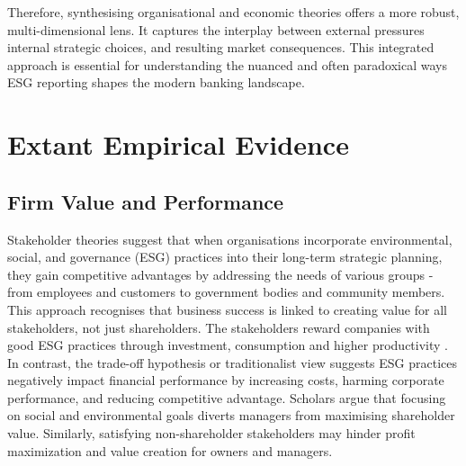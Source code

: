 \documentclass[
  authoryear]{elsarticle}
\begin{document}
Therefore, synthesising organisational and economic theories offers a
more robust, multi-dimensional lens. It captures the interplay between
external pressures internal strategic choices, and resulting market
consequences. This integrated approach is essential for understanding
the nuanced and often paradoxical ways ESG reporting shapes the modern
banking landscape.

\section{Extant Empirical Evidence}\label{extant-empirical-evidence}

\subsection{Firm Value and
Performance}\label{firm-value-and-performance}

Stakeholder theories suggest that when organisations incorporate
environmental, social, and governance (ESG) practices into their
long-term strategic planning, they gain competitive advantages by
addressing the needs of various groups - from employees and customers to
government bodies and community members. This approach recognises that
business success is linked to creating value for all stakeholders, not
just shareholders. The stakeholders reward companies with good ESG
practices through investment, consumption and higher productivity
\citep{LI2018}. In contrast, the trade-off hypothesis or traditionalist
view \citep[see][]{FRIEDMAN2007} suggests ESG practices negatively
impact financial performance by increasing costs, harming corporate
performance, and reducing competitive advantage. Scholars argue that
focusing on social and environmental goals diverts managers from
maximising shareholder value. Similarly, satisfying non-shareholder
stakeholders may hinder profit maximization and value creation for
owners and managers\citep{GALANT2017}.
\end{document}
